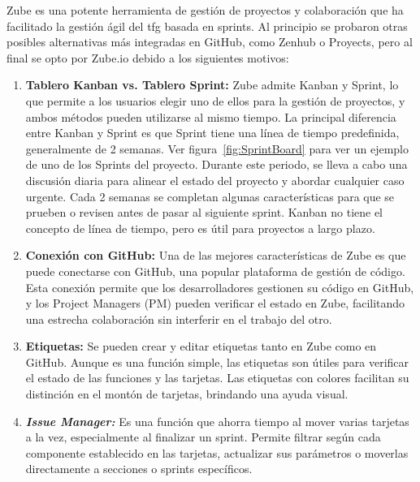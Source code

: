 Zube es una potente herramienta de gestión de proyectos y colaboración que ha facilitado la gestión ágil del tfg basada en sprints. Al principio se probaron otras posibles alternativas más integradas en GitHub, como Zenhub o Proyects, pero al final se opto por Zube.io debido a los siguientes motivos:
\begin{enumerate}

\item \textbf{Tablero Kanban vs. Tablero Sprint:} Zube admite Kanban y Sprint, lo que permite a los usuarios elegir uno de ellos para la gestión de proyectos, y ambos métodos pueden utilizarse al mismo tiempo. La principal diferencia entre Kanban y Sprint es que Sprint tiene una línea de tiempo predefinida, generalmente de 2 semanas. Ver figura~\ref{fig:SprintBoard} para ver un ejemplo de uno de los Sprints del proyecto. Durante este periodo, se lleva a cabo una discusión diaria para alinear el estado del proyecto y abordar cualquier caso urgente. Cada 2 semanas se completan algunas características para que se prueben o revisen antes de pasar al siguiente sprint. Kanban no tiene el concepto de línea de tiempo, pero es útil para proyectos a largo plazo.


\item \textbf{Conexión con GitHub:} Una de las mejores características de Zube es que puede conectarse con GitHub, una popular plataforma de gestión de código. Esta conexión permite que los desarrolladores gestionen su código en GitHub, y los Project Managers (PM) pueden verificar el estado en Zube, facilitando una estrecha colaboración sin interferir en el trabajo del otro.

\item \textbf{Etiquetas:} Se pueden crear y editar etiquetas tanto en Zube como en GitHub. Aunque es una función simple, las etiquetas son útiles para verificar el estado de las funciones y las tarjetas. Las etiquetas con colores facilitan su distinción en el montón de tarjetas, brindando una ayuda visual.

\item \textit{\textbf{Issue Manager:}} Es una función que ahorra tiempo al mover varias tarjetas a la vez, especialmente al finalizar un sprint. Permite filtrar según cada componente establecido en las tarjetas, actualizar sus parámetros o moverlas directamente a secciones o sprints específicos.

\end{enumerate}

